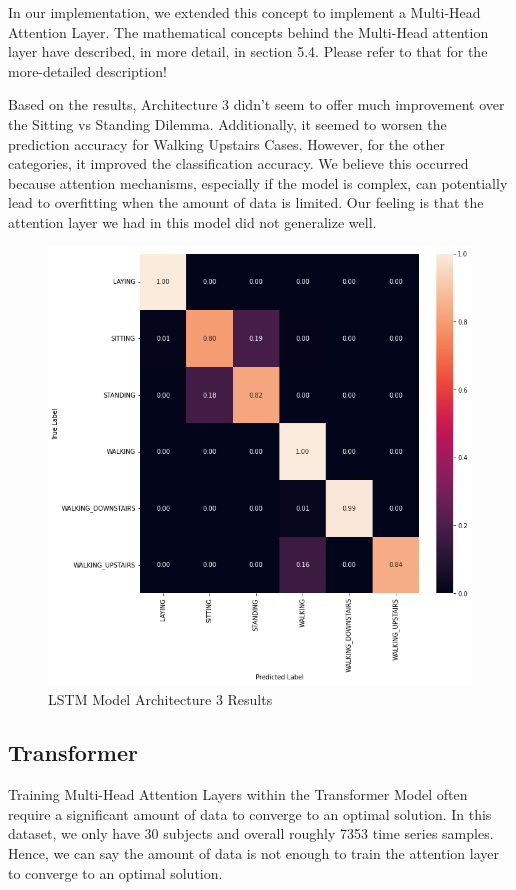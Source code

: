 \documentclass[11pt]{article}
\begin{document}
In our implementation, we extended this concept to implement a Multi-Head Attention Layer. The mathematical concepts behind the Multi-Head attention layer have described, in more detail, in section 5.4. Please refer to that for the more-detailed description! 

Based on the results, Architecture 3 didn't seem to offer much improvement over the Sitting vs Standing Dilemma. Additionally, it seemed to worsen the prediction accuracy for Walking Upstairs Cases. However, for the other categories, it improved the classification accuracy. We believe this occurred because attention mechanisms, especially if the model is complex, can potentially lead to overfitting when the amount of data is limited. Our feeling is that the attention layer we had in this model did not generalize well. 


\begin{figure}[h!]
	\includegraphics[width= 0.9 \linewidth]{LSTM(3)_Results.png}
	\centering
	\caption{LSTM Model Architecture 3 Results}
	\label{LSTM(3)_Results.png}
\end{figure}

\subsection{Transformer}
Training Multi-Head Attention Layers within the Transformer Model often require a significant amount of data to converge to an optimal solution. In this dataset, we only have 30 subjects and overall roughly 7353 time series samples. Hence, we can say the amount of data is not enough to train the attention layer to converge to an optimal solution. 
\end{document}
